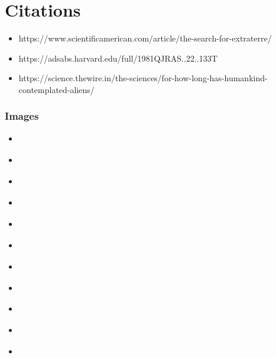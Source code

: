 \documentclass{beamer}
\newcommand{\chref}[3][blue]{\href{#2}{\color{#1}{#3}}}%
\begin{document}
\section{Citations}
\begin{frame}
\begin{itemize}
    \item \scriptsize{https://www.scientificamerican.com/article/the-search-for-extraterre/}
    \item \scriptsize{https://adsabs.harvard.edu/full/1981QJRAS..22..133T}
    \item \scriptsize{https://science.thewire.in/the-sciences/for-how-long-has-humankind-contemplated-aliens/}
\end{itemize}
\end{frame}

\begin{frame}
\frametitle{Images}
\begin{itemize}
    \item \chref{https://en.wikipedia.org/wiki/Plato\#/media/File:Plato\_Silanion\_Musei\_Capitolini\_MC1377.jpg}{Plato - Public Domain}
    \item \chref{https://en.wikipedia.org/wiki/Aristotle\#/media/File:Aristotle\_Altemps\_Inv8575.jpg}{Aristotle - Public Domain}
    \item \chref{https://en.wikipedia.org/wiki/Democritus\#/media/File:Democritus2.jpg}{Democritus - Public Domain}
    \item \chref{https://commons.wikimedia.org/wiki/File:Plutarch\_of\_Chaeronea-03\_(cropped).jpg}{Plutarch - CC BY-SA 4.0}
    \item \chref{https://www.imdb.com/title/tt0094574/mediaviewer/rm765168385}{Unsolved Mysteries - Fair Use}
    \item \chref{https://www.imdb.com/title/tt0083866/mediaviewer/rm1993282560/}{ET - Fair Use}
    \item \chref{https://www.amazon.com/Lost-Book-Enki-Prophecies-Extraterrestrial-ebook/dp/B004P1JEUW}{The Lost Book of Enky - Fair Use}
    \item \chref{https://newrepublic.com/article/126715/x-files-i-want-believe-posters-origin-story}{The X-Files - Fair Use}
    \item \chref{https://en.wikipedia.org/wiki/Thomas\_Aquinas\#/media/File:St-thomas-aquinas.jpg}{St. Thomas Aquinus - Public Domain }
    \item \chref{https://en.wikipedia.org/wiki/Albertus\_Magnus\#/media/File:AlbertusMagnus.jpg}{St. Albertus Magnus - Public Domain }
    \item \chref{https://en.wikipedia.org/wiki/Augustine\_of\_Hippo\#/media/File:Antonio\_Rodr\%C3\%ADguez\_-\_Saint\_Augustine\_-\_Google\_Art\_Project.jpg}{St. Augustine - Public Domain}
\end{itemize}
\end{frame}
\end{document}
